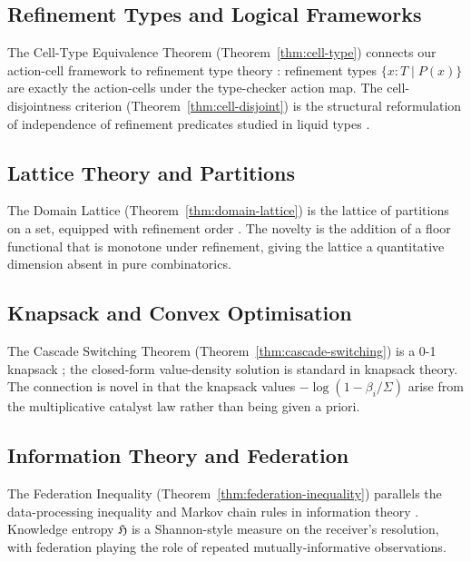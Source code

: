 \documentclass[11pt,a4paper]{article}
\newcommand{\Sigmax}{\Sigma}
\newcommand{\Hknow}{\mathfrak{H}}
\begin{document}
\subsection{Refinement Types and Logical Frameworks}

The Cell-Type Equivalence Theorem (Theorem~\ref{thm:cell-type}) connects our action-cell framework to refinement type theory \citep{rondon2008liquid,vazou2014refinement,pierce2002types}: refinement types $\{x : T \mid P(x)\}$ are exactly the action-cells under the type-checker action map. The cell-disjointness criterion (Theorem~\ref{thm:cell-disjoint}) is the structural reformulation of independence of refinement predicates studied in liquid types \citep{rondon2008liquid}.

\subsection{Lattice Theory and Partitions}

The Domain Lattice (Theorem~\ref{thm:domain-lattice}) is the lattice of partitions on a set, equipped with refinement order \citep{birkhoff1948lattice,davey2002introduction}. The novelty is the addition of a floor functional that is monotone under refinement, giving the lattice a quantitative dimension absent in pure combinatorics.

\subsection{Knapsack and Convex Optimisation}

The Cascade Switching Theorem (Theorem~\ref{thm:cascade-switching}) is a 0-1 knapsack \citep{martello1990knapsack,kellerer2004knapsack}; the closed-form value-density solution is standard in knapsack theory. The connection is novel in that the knapsack values $-\log(1 - \beta_i/\Sigmax)$ arise from the multiplicative catalyst law rather than being given a priori.

\subsection{Information Theory and Federation}

The Federation Inequality (Theorem~\ref{thm:federation-inequality}) parallels the data-processing inequality and Markov chain rules in information theory \citep{cover2006elements,kullback1951information}. Knowledge entropy $\Hknow$ is a Shannon-style measure on the receiver's resolution, with federation playing the role of repeated mutually-informative observations.
\end{document}
